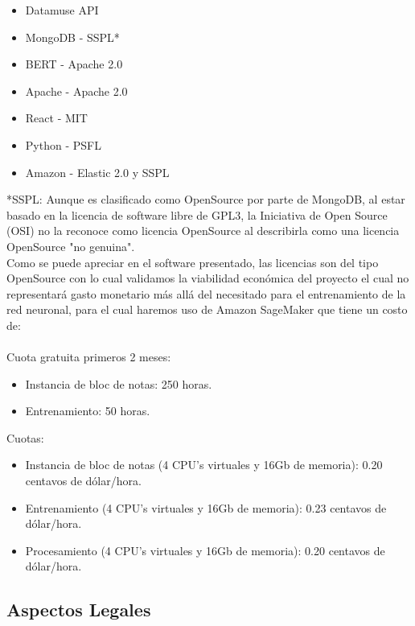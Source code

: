 \documentclass[12pt, a4paper, titlepage]{report}
\begin{document}
		\begin{itemize}
			\item Datamuse API \cite{refDatamuseLicense}
			\item MongoDB - SSPL* \cite{refMongoDBLicense}
			\item BERT - Apache 2.0 \cite{refBERTLicense}
			\item Apache - Apache 2.0 \cite{refApacheLicense}
			\item React - MIT \cite{refReactLicense}
			\item Python - PSFL \cite{refPythonLicense}
			\item Amazon - Elastic 2.0 y SSPL \cite{refAmazonLicense}
		\end{itemize}
		
		*SSPL: Aunque es clasificado como OpenSource por parte de MongoDB, al estar basado en la licencia de software libre de GPL3, la Iniciativa de Open Source (OSI) no la reconoce como licencia OpenSource al describirla como una licencia OpenSource "no genuina".\\
		
		Como se puede apreciar en el software presentado, las licencias son del tipo OpenSource con lo cual validamos la viabilidad económica del proyecto el cual no representará gasto monetario más allá del necesitado para el entrenamiento de la red neuronal, para el cual haremos uso de Amazon SageMaker que tiene un costo de:\\\\
		Cuota gratuita primeros 2 meses:
		\begin{itemize}
			\item Instancia de bloc de notas: 250 horas.
			\item Entrenamiento: 50 horas. 
		\end{itemize}
		Cuotas:
		\begin{itemize}
			\item Instancia de bloc de notas (4 CPU's virtuales y 16Gb de memoria): 0.20 centavos de dólar/hora.
			\item Entrenamiento (4 CPU's virtuales y 16Gb de memoria): 0.23 centavos de dólar/hora.
			\item Procesamiento (4 CPU's virtuales y 16Gb de memoria): 0.20 centavos de dólar/hora.
		\end{itemize}	

		\newpage
		\subsection{Aspectos Legales}
\end{document}
